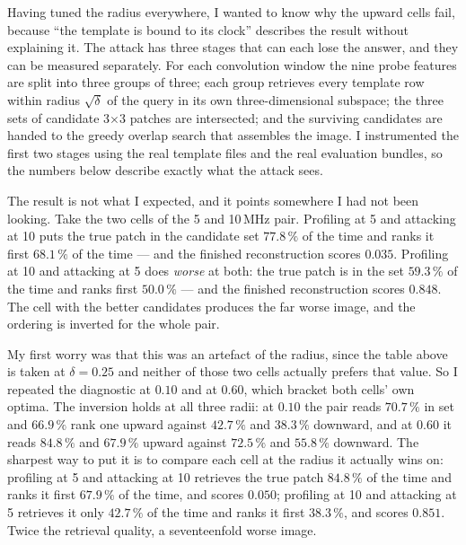 \documentclass[11pt,a4paper]{article}
\begin{document}
Having tuned the radius everywhere, I wanted to know why the upward cells fail, because
``the template is bound to its clock'' describes the result without explaining it. The
attack has three stages that can each lose the answer, and they can be measured separately.
For each convolution window the nine probe features are split into three groups of three;
each group retrieves every template row within radius $\sqrt{\delta}$ of the query in its
own three-dimensional subspace; the three sets of candidate 3$\times$3 patches are
intersected; and the surviving candidates are handed to the greedy overlap search that
assembles the image. I instrumented the first two stages using the real template files and
the real evaluation bundles, so the numbers below describe exactly what the attack sees.

\begin{table}[h]
  \centering
  \small
  
  \caption{Candidate quality against final result, at $\delta = 0.25$. ``In set'' is how
  often the true patch survives the three-way intersection; ``rank 1'' is how often it is
  also the closest candidate in the full nine-dimensional feature space.}
  \label{tab:stage}
\end{table}

The result is not what I expected, and it points somewhere I had not been looking. Take the
two cells of the 5 and 10\,MHz pair. Profiling at 5 and attacking at 10 puts the true patch
in the candidate set $77.8\,\%$ of the time and ranks it first $68.1\,\%$ of the time --- and
the finished reconstruction scores $0.035$. Profiling at 10 and attacking at 5 does
\emph{worse} at both: the true patch is in the set $59.3\,\%$ of the time and ranks first
$50.0\,\%$ --- and the finished reconstruction scores $0.848$. The cell with the better
candidates produces the far worse image, and the ordering is inverted for the whole pair.

My first worry was that this was an artefact of the radius, since the table above is taken
at $\delta = 0.25$ and neither of those two cells actually prefers that value. So I repeated
the diagnostic at $0.10$ and at $0.60$, which bracket both cells' own optima. The inversion
holds at all three radii: at $0.10$ the pair reads $70.7\,\%$ in set and $66.9\,\%$ rank one
upward against $42.7\,\%$ and $38.3\,\%$ downward, and at $0.60$ it reads $84.8\,\%$ and
$67.9\,\%$ upward against $72.5\,\%$ and $55.8\,\%$ downward. The sharpest way to put it is
to compare each cell at the radius it actually wins on: profiling at 5 and attacking at 10
retrieves the true patch $84.8\,\%$ of the time and ranks it first $67.9\,\%$ of the time,
and scores $0.050$; profiling at 10 and attacking at 5 retrieves it only $42.7\,\%$ of the
time and ranks it first $38.3\,\%$, and scores $0.851$. Twice the retrieval quality, a
seventeenfold worse image.
\end{document}
